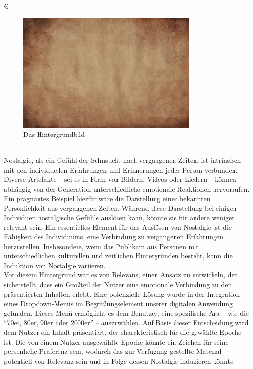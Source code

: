 €\documentclass[./dokumentation.tex]{subfiles}
\begin{document}
\begin{figure}[H]
    \centering
    \includegraphics[width=0.8\textwidth]{bilder/hintergrund-scott.png}
    \caption{Das Hintergrundbild}
    \label{fig23:hintergrund}
\end{figure}\\


Nostalgie, als ein Gefühl der Sehnsucht nach vergangenen Zeiten, ist intrinsisch mit den individuellen Erfahrungen und Erinnerungen jeder Person verbunden. Diverse Artefakte – sei es in Form von Bildern, Videos oder Liedern – können abhängig von der Generation unterschiedliche emotionale Reaktionen hervorrufen. Ein prägnantes Beispiel hierfür wäre die Darstellung einer bekannten Persönlichkeit aus vergangenen Zeiten. Während diese Darstellung bei einigen Individuen nostalgische Gefühle auslösen kann, könnte sie für andere weniger relevant sein. Ein essentielles Element für das Auslösen von Nostalgie ist die Fähigkeit des Individuums, eine Verbindung zu vergangenen Erfahrungen herzustellen. Insbesondere, wenn das Publikum aus Personen mit unterschiedlichen kulturellen und zeitlichen Hintergründen besteht, kann die Induktion von Nostalgie variieren. \\

Vor diesem Hintergrund war es von Relevanz, einen Ansatz zu entwickeln, der sicherstellt, dass ein Großteil der Nutzer eine emotionale Verbindung zu den präsentierten Inhalten erlebt. Eine potenzielle Lösung wurde in der Integration eines Dropdown-Menüs im Begrüßungselement unserer digitalen Anwendung gefunden. Dieses Menü ermöglicht es dem Benutzer, eine spezifische Ära – wie die “70er, 80er, 90er oder 2000er” – auszuwählen. Auf Basis dieser Entscheidung wird dem Nutzer ein Inhalt präsentiert, der charakteristisch für die gewählte Epoche ist. Die von einem Nutzer ausgewählte Epoche könnte ein Zeichen für seine persönliche Präferenz sein, wodurch das zur Verfügung gestellte Material potentiell von Relevanz sein und in Folge dessen Nostalgie induzieren könnte. \\
\end{document}
